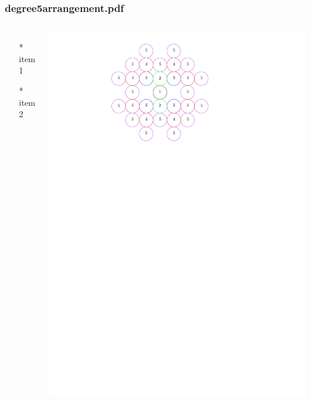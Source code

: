 \begin{frame} \frametitle{degree5arrangement.pdf}
    \begin{columns}[c]
        \begin{itemize}
            \item[*] item 1
            \item[*] item 2
        \end{itemize}
        \begin{minipage}{\linewidth}
            \begin{center}
            \includegraphics[width=.9\textwidth]{graphics/degree5arrangement.pdf}
            \label{gfx:degree5arrangement.pdf}
            \end{center}
        \end{minipage}
    \end{columns}
\end{frame}
